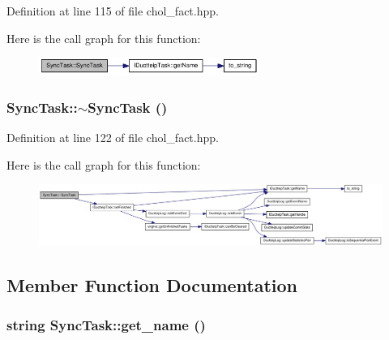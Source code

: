 Definition at line 115 of file chol\_\-fact.hpp.

Here is the call graph for this function:\nopagebreak
\begin{figure}[H]
\begin{center}
\leavevmode
\includegraphics[width=203pt]{struct_sync_task_a5bb3343352ebd177a3f8b71e048db67e_cgraph}
\end{center}
\end{figure}
\hypertarget{struct_sync_task_a2abccd8a59e9080dff8e8b9fc2d11107}{
\subsubsection[{$\sim$SyncTask}]{\setlength{\rightskip}{0pt plus 5cm}SyncTask::$\sim$SyncTask ()}}
\label{struct_sync_task_a2abccd8a59e9080dff8e8b9fc2d11107}


Definition at line 122 of file chol\_\-fact.hpp.

Here is the call graph for this function:\nopagebreak
\begin{figure}[H]
\begin{center}
\leavevmode
\includegraphics[width=420pt]{struct_sync_task_a2abccd8a59e9080dff8e8b9fc2d11107_cgraph}
\end{center}
\end{figure}


\subsection{Member Function Documentation}
\hypertarget{struct_sync_task_a12a683de3635d371b0a25a34df27b1a8}{
\subsubsection[{get\_\-name}]{\setlength{\rightskip}{0pt plus 5cm}string SyncTask::get\_\-name ()}}
\label{struct_sync_task_a12a683de3635d371b0a25a34df27b1a8}


